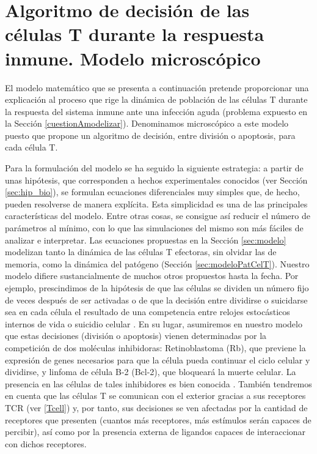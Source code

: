\chapter{Algoritmo de decisión de las células T durante la respuesta inmune. Modelo microscópico}
\label{cap:descripcionTrabajo}


El modelo matemático que se presenta a continuación pretende proporcionar una explicación al proceso que rige la dinámica de población de las células T durante la respuesta del sistema inmune ante una infección aguda (problema expuesto en la Sección \ref{cuestionAmodelizar}). Denominamos microscópico a este modelo puesto que propone un algoritmo de decisión, entre división o apoptosis, para cada célula T. %

Para la formulación del modelo se ha seguido la siguiente estrategia: a partir de unas hipótesis, que corresponden a hechos experimentales conocidos (ver Sección \ref{sec:hip_bio}), se formulan ecuaciones diferenciales muy simples que, de hecho, pueden resolverse de manera explícita. Esta simplicidad es una de las principales características del modelo. Entre otras cosas, se consigue así reducir el número de parámetros al mínimo, con lo que las simulaciones del mismo son más fáciles de analizar e interpretar. Las ecuaciones propuestas en la Sección \ref{sec:modelo} modelizan tanto la dinámica de las células T efectoras, sin olvidar las de memoria, como la dinámica del patógeno (Sección \ref{sec:modeloPatCelT}). Nuestro modelo difiere sustancialmente de muchos otros propuestos hasta la fecha. Por ejemplo, prescindimos de la hipótesis de que las células se dividen un número fijo de veces después de ser activadas \citep{Hawkins5032} o de que la decisión entre dividirse o suicidarse sea en cada célula el resultado de una competencia entre relojes estocásticos internos de vida o suicidio celular \citep{DUFFY2012457}. En su lugar, asumiremos en nuestro modelo que estas decisiones (división o apoptosis) vienen determinadas por la competición de dos moléculas inhibidoras: Retinoblastoma (Rb), que previene la expresión de genes necesarios para que la célula pueda continuar el ciclo celular y dividirse, y linfoma de célula B-2 (Bcl-2), que bloqueará la muerte celular. La presencia en las células de tales inhibidores es bien conocida \citep{fernandez2012mecanica}. También tendremos en cuenta que las células T se comunican con el exterior gracias a sus receptores TCR (ver \ref{Tcell}) y, por tanto, sus decisiones se ven afectadas por la cantidad de receptores que presenten (cuantos más receptores, más estímulos serán capaces de percibir), así como por la presencia externa de ligandos capaces de interaccionar con dichos receptores.

